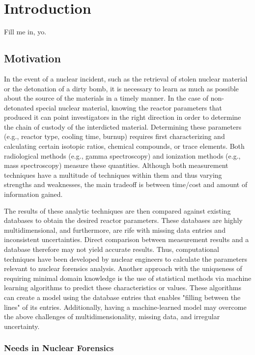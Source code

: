 \chapter{Introduction}
\label{ch:intro}

Fill me in, yo.

\section{Motivation}
\label{sec:motivation}

In the event of a nuclear incident, such as the retrieval of stolen nuclear
material or the detonation of a dirty bomb, it is necessary to learn as much as
possible about the source of the materials in a timely manner. In the case of
non-detonated special nuclear material, knowing the reactor parameters that
produced it can point investigators in the right direction in order to
determine the chain of custody of the interdicted material. Determining these
parameters (e.g., reactor type, cooling time, burnup) requires first
characterizing and calculating certain isotopic ratios, chemical compounds, or
trace elements.  Both radiological methods (e.g., gamma spectroscopy) and
ionization methods (e.g., mass spectroscopy) measure these quantities. Although
both measurement techniques have a multitude of techniques within them and thus
varying strengths and weaknesses, the main tradeoff is between time/cost and
amount of information gained. 

The results of these analytic techniques are then compared against existing
databases to obtain the desired reactor parameters. These databases are highly
multidimensional, and furthermore, are rife with missing data entries and
inconsistent uncertainties. Direct comparison between measurement results and a
database therefore may not yield accurate results. Thus, computational
techniques have been developed by nuclear engineers to calculate the parameters
relevant to nuclear forensics analysis.  Another approach with the uniqueness of requiring minimal domain
knowledge is the use of statistical methods via machine learning algorithms to
predict these characteristics or values. These algorithms can create a model
using the database entries that enables "filling between the lines" of its
entries. Additionally, having a machine-learned model may overcome the above
challenges of multidimensionality, missing data, and irregular uncertainty.

\subsection{Needs in Nuclear Forensics}


